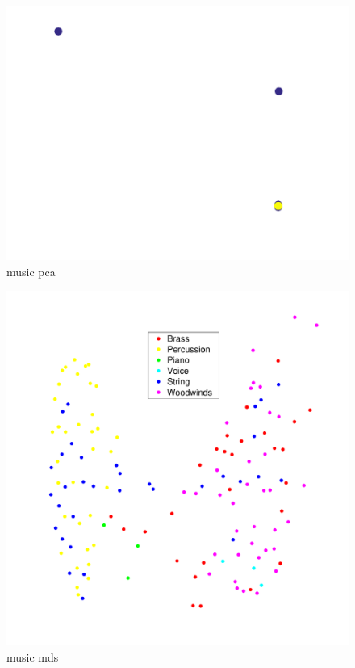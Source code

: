 \documentclass[12pt,a4paper,fleqn]{tufte-handout}
\begin{document}
\begin{figure}   
\begin{center}   
\includegraphics[scale=.5]{figures/music_pca}   
\caption{music pca}   
\end{center}   
\end{figure}   
 
\begin{figure}   
\begin{center}   
\includegraphics[scale=.5]{figures/music_mds}   
\caption{music mds}   
\end{center}   
\end{figure}   
 
\end{document}
